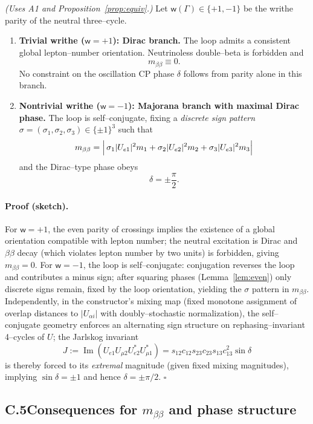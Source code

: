 \documentclass[11pt]{article}
\begin{document}
\begin{theorem}\label{thm:cp}
\emph{(Uses A1 and Proposition~\ref{prop:equiv}.)}
Let $\mathsf{w}(\Gamma)\in\{+1,-1\}$ be the writhe parity of the neutral three–cycle.
\begin{enumerate}
  \item \textbf{Trivial writhe ($\mathsf{w}=+1$): Dirac branch.} The loop admits a consistent global lepton–number orientation. Neutrinoless double–beta is forbidden and
  \[
  m_{\beta\beta}\equiv 0.
  \]
  No constraint on the oscillation CP phase $\delta$ follows from parity alone in this branch.
  \item \textbf{Nontrivial writhe ($\mathsf{w}=-1$): Majorana branch with maximal Dirac phase.} The loop is self–conjugate, fixing a \emph{discrete sign pattern} $\sigma=(\sigma_1,\sigma_2,\sigma_3)\in\{\pm1\}^3$ such that
  \[
  m_{\beta\beta}=\Bigl|\,\sigma_1|U_{e1}|^2m_1+\sigma_2|U_{e2}|^2m_2+\sigma_3|U_{e3}|^2m_3\Bigr|
  \]
  and the Dirac–type phase obeys
  \[
  \delta=\pm\frac{\pi}{2}.
  \]
\end{enumerate}
\end{theorem}

\paragraph{Proof (sketch).}
For $\mathsf{w}=+1$, the even parity of crossings implies the existence of a global orientation compatible with lepton number; the neutral excitation is Dirac and $\beta\beta$ decay (which violates lepton number by two units) is forbidden, giving $m_{\beta\beta}=0$. For $\mathsf{w}=-1$, the loop is self–conjugate: conjugation reverses the loop and contributes a minus sign; after squaring phases (Lemma~\ref{lem:even}) only discrete signs remain, fixed by the loop orientation, yielding the $\sigma$ pattern in $m_{\beta\beta}$. Independently, in the constructor’s mixing map (fixed monotone assignment of overlap distances to $|U_{\alpha i}|$ with doubly–stochastic normalization), the self–conjugate geometry enforces an alternating sign structure on rephasing–invariant 4–cycles of $U$; the Jarlskog invariant
\[
J:=\operatorname{Im}(U_{e1}U_{\mu2}U_{e2}^\ast U_{\mu1}^\ast)=s_{12}c_{12}s_{23}c_{23}s_{13}c_{13}^2\sin\delta
\]
is thereby forced to its \emph{extremal} magnitude (given fixed mixing magnitudes), implying $\sin\delta=\pm 1$ and hence $\delta=\pm \pi/2$. \hfill$\square$

\subsection*{C.5\quad Consequences for $m_{\beta\beta}$ and phase structure}
\end{document}
